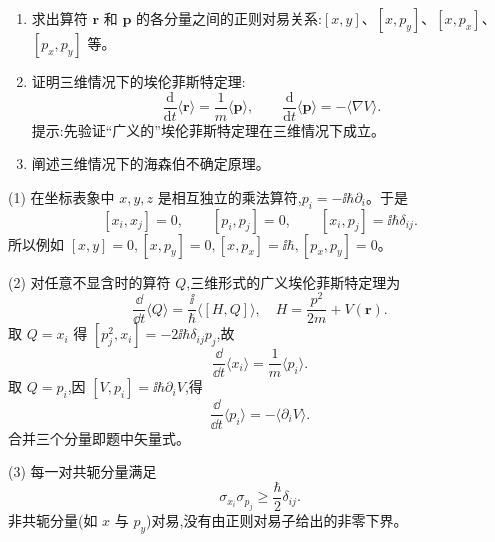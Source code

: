 \begin{question}
\begin{enumerate}
\item 求出算符 $\mathbf r$ 和 $\mathbf p$ 的各分量之间的正则对易关系:$[x,y]$、$[x,p_y]$、$[x,p_x]$、$[p_x,p_y]$ 等。
\item 证明三维情况下的埃伦菲斯特定理:
\[
\frac{\mathrm d}{\mathrm dt}\langle \mathbf r\rangle=\frac1m\langle \mathbf p\rangle,
\qquad
\frac{\mathrm d}{\mathrm dt}\langle \mathbf p\rangle=-\langle \nabla V\rangle .
\]
提示:先验证“广义的”埃伦菲斯特定理在三维情况下成立。
\item 阐述三维情况下的海森伯不确定原理。
\end{enumerate}
\end{question}
\begin{solution}

(1) 在坐标表象中 $x,y,z$ 是相互独立的乘法算符,$p_i=-\ii\hbar\partial_i$。于是
\[
[x_i,x_j]=0,\qquad [p_i,p_j]=0,\qquad [x_i,p_j]=\ii\hbar\delta_{ij}.
\]
所以例如 $[x,y]=0,[x,p_y]=0,[x,p_x]=\ii\hbar,[p_x,p_y]=0$。

(2) 对任意不显含时的算符 $Q$,三维形式的广义埃伦菲斯特定理为
\[
\frac{\dd}{\dd t}\langle Q\rangle=\frac{\ii}{\hbar}\langle[H,Q]\rangle,
\quad H=\frac{p^2}{2m}+V(\mathbf r).
\]
取 $Q=x_i$ 得 $[p_j^2,x_i]=-2\ii\hbar\delta_{ij}p_j$,故
\[
\frac{\dd}{\dd t}\langle x_i\rangle=\frac{1}{m}\langle p_i\rangle.
\]
取 $Q=p_i$,因 $[V,p_i]=\ii\hbar\partial_iV$,得
\[
\frac{\dd}{\dd t}\langle p_i\rangle=-\langle\partial_iV\rangle.
\]
合并三个分量即题中矢量式。

(3) 每一对共轭分量满足
\[
\sigma_{x_i}\sigma_{p_j}\ge \frac{\hbar}{2}\delta_{ij}.
\]
非共轭分量(如 $x$ 与 $p_y$)对易,没有由正则对易子给出的非零下界。

\end{solution}

